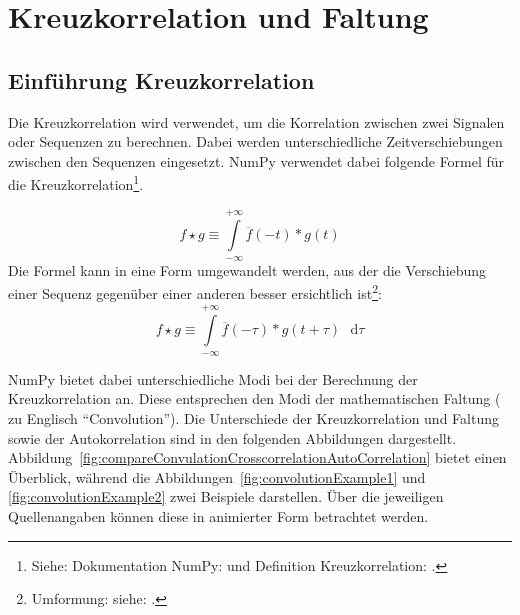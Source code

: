 \chapter{Kreuzkorrelation und Faltung}
\section{Einführung Kreuzkorrelation}
Die Kreuzkorrelation wird verwendet, um die Korrelation zwischen zwei Signalen oder Sequenzen zu berechnen. Dabei werden unterschiedliche Zeitverschiebungen zwischen
den Sequenzen eingesetzt. NumPy verwendet dabei folgende Formel für die 
Kreuzkorrelation\footnote{Siehe: Dokumentation NumPy:\cite{DocumentationNumpyCorrelate} und Definition Kreuzkorrelation: \cite{DefinitionCrossCorrelation}.}.

\[
  f \star g \equiv \int\limits_{-\infty}^{+\infty} \overline{f}(-t)*g(t)
\]
Die Formel kann in eine Form umgewandelt werden, aus der die Verschiebung einer Sequenz gegenüber einer anderen besser ersichtlich 
ist\footnote{Umformung: siehe: \cite{DefinitionCrossCorrelation}.}:
\[
  f \star g \equiv \int\limits_{-\infty}^{+\infty} \overline{f}(-\tau)*g(t + \tau) \text{ } \mathrm{d}\tau
\]

NumPy bietet dabei unterschiedliche Modi bei der Berechnung der Kreuzkorrelation an. Diese entsprechen den Modi der mathematischen Faltung ( zu Englisch \enquote{Convolution}).
Die Unterschiede der Kreuzkorrelation und Faltung sowie der Autokorrelation sind in den folgenden Abbildungen dargestellt.
Abbildung~\ref{fig:compareConvulationCrosscorrelationAutoCorrelation} bietet einen Überblick, während die Abbildungen~\ref{fig:convolutionExample1} und \ref{fig:convolutionExample2} zwei Beispiele darstellen.
Über die jeweiligen Quellenangaben können diese in animierter Form betrachtet werden.

